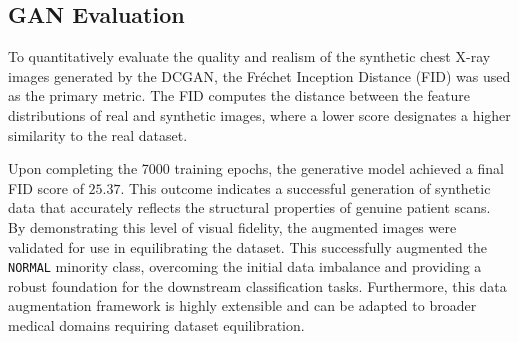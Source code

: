 \subsection{GAN Evaluation}
\label{subsec:gan_evaluation}

To quantitatively evaluate the quality and realism of the synthetic
chest X-ray images generated by the DCGAN, the Fréchet Inception
Distance (FID) \cite{Heusel2017FID} was used as the primary
metric. The FID computes the distance between the feature
distributions of real and synthetic images, where a lower score
designates a higher similarity to the real dataset.

Upon completing the 7000 training epochs, the generative model
achieved a final FID score of $25.37$. This outcome indicates a
successful generation of synthetic data that accurately reflects the
structural properties of genuine patient scans. By demonstrating this
level of visual fidelity, the augmented images were validated for use
in equilibrating the dataset. This successfully augmented the
\texttt{NORMAL} minority class, overcoming the initial data imbalance
and providing a robust foundation for the downstream classification
tasks. Furthermore, this data augmentation framework is highly
extensible and can be adapted to broader medical domains requiring 
dataset equilibration.